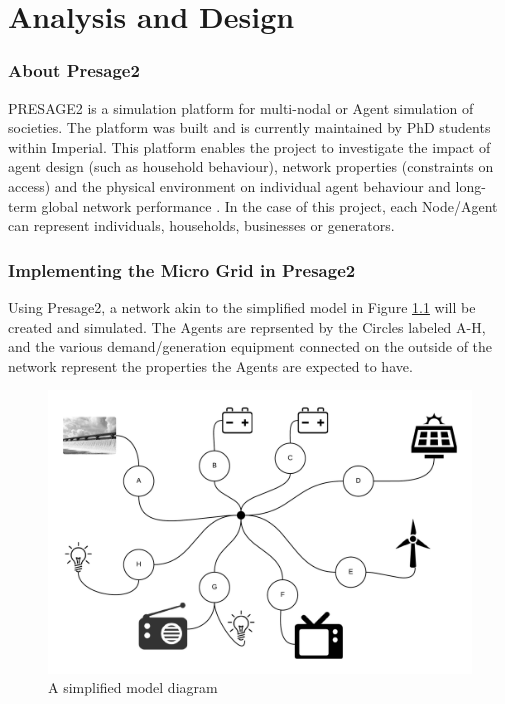 \chapter{Analysis and Design}
\label{analysis}

\subsection{About Presage2}
PRESAGE2 is a simulation platform for multi-nodal or Agent simulation of societies. The platform was built and is currently maintained by PhD students within Imperial. This platform enables the project to investigate the impact of agent design (such as household behaviour), network properties (constraints on access) and the physical environment on individual agent behaviour and long-term global network performance \cite{Presage2-Desc:2015}. In the case of this project, each Node/Agent can represent individuals, households, businesses or generators. 

\subsection{Implementing the Micro Grid in Presage2}
Using Presage2, a network akin to the simplified model in Figure \ref{fig:SimpleModel} will be created and simulated. The Agents are reprsented by the Circles labeled A-H, and the various demand/generation equipment connected on the outside of the network represent the properties the Agents are expected to have.

\begin{figure}[h!]
\centering
\includegraphics[scale=0.8]{Images/Model.png}
\caption{A simplified model diagram}
\label{fig:SimpleModel}
\end{figure}

